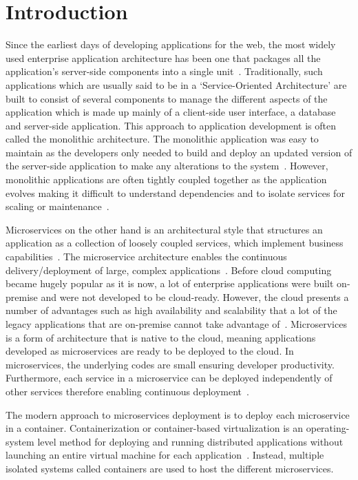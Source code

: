 \section{Introduction}

Since the earliest days of developing applications for the web, the
most widely used enterprise application architecture has been one that
packages all the application’s server-side components into a single
unit~\cite{hid-sp18-501-infoq}. Traditionally, such applications which
are usually said to be in a ‘Service-Oriented Architecture’ are built
to consist of several components to manage the different aspects of
the application which is made up mainly of a client-side user
interface, a database and server-side application. This approach to
application development is often called the monolithic
architecture. The monolithic application was easy to maintain as the
developers only needed to build and deploy an updated version of the
server-side application to make any alterations to the
system~\cite{hid-sp18-501-mulesoft}. However, monolithic applications
are often tightly coupled together as the application evolves making
it difficult to understand dependencies and to isolate services for
scaling or maintenance~\cite{hid-sp18-501-trello}.
 
Microservices on the other hand is an architectural style that
structures an application as a collection of loosely coupled services,
which implement business
capabilities~\cite{hid-sp18-501-microservicesio}. The microservice
architecture enables the continuous delivery/deployment of large,
complex applications~\cite{hid-sp18-501-researchgate}. 
Before cloud computing became hugely popular as it
is now, a lot of enterprise applications were built on-premise and
were not developed to be cloud-ready. However, the cloud presents a
number of advantages such as high availability and scalability that a
lot of the legacy applications that are on-premise cannot take
advantage of~\cite{hid-sp18-501-springer}. Microservices is a form of
architecture that is native to the cloud, meaning applications
developed as microservices are ready to be deployed to the cloud. In
microservices, the underlying codes are small ensuring developer
productivity. Furthermore, each service in a microservice can be
deployed independently of other services therefore enabling continuous
deployment~\cite{hid-sp18-501-infoq}.

The modern approach to microservices deployment is to deploy each
microservice in a container. Containerization or container-based
virtualization is an operating-system level method for deploying and
running distributed applications without launching an entire virtual
machine for each application~\cite{hid-sp18-501-techtarget}. Instead,
multiple isolated systems called containers are used to host the
different microservices.

